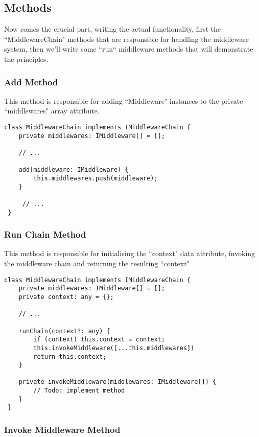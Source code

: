 \documentclass[12pt]{article}
\begin{document}
\subsection{Methods}

Now comes the crucial part, writing the actual functionality, first the ``MiddlewareChain" methods that are responsible for handling the middleware system, then we'll write some ``run`` middleware methods that will demonstrate the principles.

\subsubsection{Add Method}

This method is responsible for adding ``Middleware" instances to the private ``middlewares" array attribute.

\begin{lstlisting}[caption=add Method,label=code:add]
class MiddlewareChain implements IMiddlewareChain {
    private middlewares: IMiddleware[] = [];
    
    // ...
   
    add(middleware: IMiddleware) {
        this.middlewares.push(middleware);
    }

     // ...
 }
\end{lstlisting}

\subsubsection{Run Chain Method}

This method is responsible for initialising the ``context" data attribute, invoking the middleware chain and returning the resulting ``context"

\begin{lstlisting}[caption=runChain Method,label=code:runchain]
class MiddlewareChain implements IMiddlewareChain {
    private middlewares: IMiddleware[] = [];
    private context: any = {};

    // ...

    runChain(context?: any) {
        if (context) this.context = context;
        this.invokeMiddleware([...this.middlewares])
        return this.context;
    }

    private invokeMiddleware(middlewares: IMiddleware[]) {
        // Todo: implement method
    }
 }
\end{lstlisting}

\subsubsection{Invoke Middleware Method}
\end{document}
